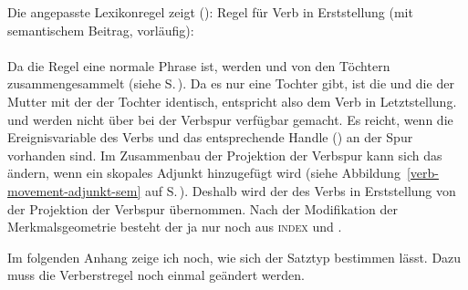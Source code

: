Die angepasste Lexikonregel zeigt ():
\eas
\label{lr-verb-movement3}%
Regel für Verb in Erststellung (mit semantischem Beitrag, vorläufig):\\
 \impl\\
\zs
Da die Regel eine normale Phrase ist, werden \rels und \hcons von den Töchtern zusammengesammelt
(siehe S.\,\pageref{constraint-RELS}). Da es nur eine Tochter gibt, ist die \relsl und die \hconsl der Mutter mit der
der Tochter identisch, entspricht also dem Verb in Letztstellung. \rels und \hcons werden nicht über \dsl bei der Verbspur verfügbar
gemacht. Es reicht, wenn die Ereignisvariable des Verbs und das entsprechende Handle (\ltop) an der Spur
vorhanden sind. Im Zusammenbau der Projektion der Verbspur kann sich das \ltop ändern, wenn ein
skopales Adjunkt hinzugefügt wird (siehe Abbildung~\ref{verb-movement-adjunkt-sem} auf
S.\,\pageref{verb-movement-adjunkt-sem}). Deshalb wird der \contw des Verbs in Erststellung von der
Projektion der Verbspur übernommen. Nach der Modifikation der Merkmalsgeometrie besteht der \contw
ja nur noch aus \textsc{index} und \ltop.

Im folgenden Anhang zeige ich noch, wie sich der Satztyp bestimmen lässt. Dazu muss die
Verberstregel noch einmal geändert werden.

